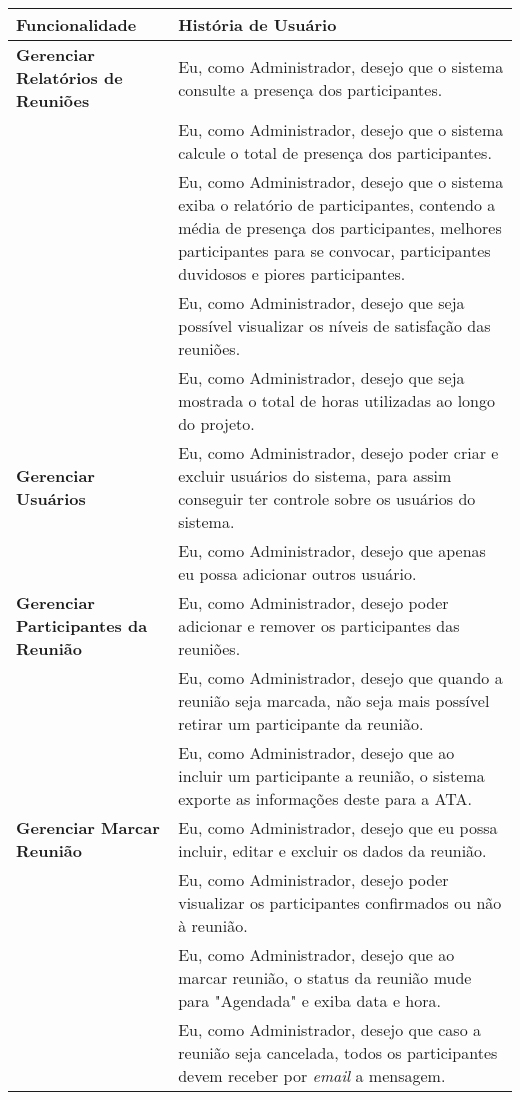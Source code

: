 \begin{table}[H]
	\begin{tabular}{|p{5.0cm}|p{10.0cm}|} 
	\hline
	\textbf{Funcionalidade} & \textbf{História de Usuário} \\ \hline
	\textbf{Gerenciar Relatórios de Reuniões} & Eu, como Administrador, desejo que o sistema consulte a presença dos participantes. \\ \hline
	& Eu, como Administrador, desejo que o sistema calcule o total de presença dos participantes. \\ \hline
	& Eu, como Administrador, desejo que o sistema exiba o relatório de participantes, contendo a média de presença dos participantes, melhores participantes para se convocar, participantes duvidosos e piores participantes. \\ \hline
	& Eu, como Administrador, desejo que seja possível visualizar os níveis de satisfação das reuniões. \\ \hline
	& Eu, como Administrador, desejo que seja mostrada o total de horas utilizadas ao longo do projeto. \\ \hline
	\textbf{Gerenciar Usuários} & Eu, como Administrador, desejo poder criar e excluir usuários do sistema, para assim conseguir ter controle sobre os usuários do sistema. \\ \hline
	& Eu, como Administrador, desejo que apenas eu possa adicionar outros usuário. \\ \hline
	\textbf{Gerenciar Participantes da Reunião} &  Eu, como Administrador, desejo poder adicionar e remover os participantes das reuniões. \\ \hline
	& Eu, como Administrador, desejo que quando a reunião seja marcada, não seja mais possível retirar um participante da reunião. \\ \hline
	& Eu, como Administrador, desejo que ao incluir um participante a reunião, o sistema exporte as informações deste para a ATA. \\ \hline
	\textbf{Gerenciar Marcar Reunião} & Eu, como Administrador, desejo que eu possa incluir, editar e excluir os dados da reunião. \\ \hline
	& Eu, como Administrador, desejo poder visualizar os participantes confirmados ou não à reunião. \\ \hline
	& Eu, como Administrador, desejo que ao marcar reunião, o status da reunião mude para "Agendada" e exiba data e hora. \\ \hline
	& Eu, como Administrador, desejo que caso a reunião seja cancelada, todos os participantes devem receber por \textit{email} a mensagem. \\ \hline

\end{tabular}
\end{table}
